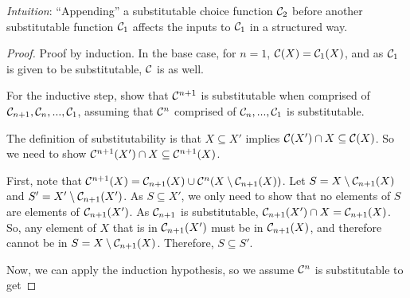 \textit{Intuition}:
``Appending'' a substitutable choice function $\mathcal{C}_2$ before another substitutable function $\mathcal{C}_1$ affects the inputs to $\mathcal{C}_1$ in a structured way.
\begin{proof}
    Proof by induction.
    In the base case, for $n = 1$, $\mathcal{C}(X) = \mathcal{C}_1(X)$, and as $\mathcal{C}_1$ is given to be substitutable, $\mathcal{C}$ is as well.

    For the inductive step, show that $\mathcal{C}^{n+1}$ is substitutable when comprised of $\mathcal{C}_{n+1}, \mathcal{C}_n, ..., \mathcal{C}_1$, assuming that $\mathcal{C}^n$ comprised of $\mathcal{C}_n,...,\mathcal{C}_1$ is substitutable.

    The definition of substitutability is that $X \subseteq X'$ implies $\mathcal{C}(X') \cap X \subseteq \mathcal{C}(X)$. So we need to show $\mathcal{C}^{n+1}(X') \cap X \subseteq \mathcal{C}^{n+1}(X)$.

    First, note that $\mathcal{C}^{n+1}(X) = \mathcal{C}_{n+1}(X) \cup \mathcal{C}^n(X \setminus \mathcal{C}_{n+1}(X))$.
    Let $S = X \setminus \mathcal{C}_{n+1}(X)$ and $S' = X' \setminus \mathcal{C}_{n+1}(X')$. As $S \subseteq X'$, we only need to show that no elements of $S$ are elements of $\mathcal{C}_{n+1}(X')$. As $\mathcal{C}_{n+1}$ is substitutable, $\mathcal{C}_{n+1}(X') \cap X = \mathcal{C}_{n+1}(X)$. So, any element of $X$ that is in $\mathcal{C}_{n+1}(X') $ must be in $\mathcal{C}_{n+1}(X)$, and therefore cannot be in $S = X \setminus \mathcal{C}_{n+1}(X)$. Therefore, $S \subseteq S'$.

    Now, we can apply the induction hypothesis, so we assume $\mathcal{C}^n$ is substitutable to get


\end{proof}
